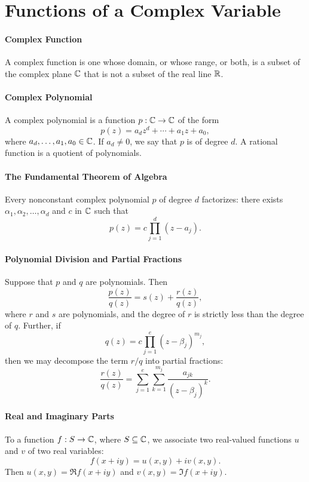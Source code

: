 \section{Functions of a Complex Variable}

\paragraph{Complex Function}
A complex function is one whose domain, or whose range, or both, is a subset of the complex plane \(\mathbb{C}\) that is not a subset of the real line \(\mathbb{R}\).

\paragraph{Complex Polynomial}
A complex polynomial is a function \(p: \mathbb{C} \to \mathbb{C}\) of the form
\[p(z) = a_dz^d + \cdots + a_1z + a_0,\]
where \(a_d, \dots, a_1, a_0 \in \mathbb{C}\). If \(a_d \neq 0\), we say that \(p\) is of degree \(d\). A rational function is a quotient of polynomials.

\paragraph{The Fundamental Theorem of Algebra}
Every nonconstant complex polynomial \(p\) of degree \(d\) factorizes: there exists \(\alpha_1, \alpha_2, \dots, \alpha_d\) and \(c\) in \(\mathbb{C}\) such that
\[p(z) = c \prod_{j=1}^d (z - a_j).\]

\paragraph{Polynomial Division and Partial Fractions}
Suppose that \(p\) and \(q\) are polynomials. Then
\[\frac{p(z)}{q(z)} = s(z) + \frac{r(z)}{q(z)},\]
where \(r\) and \(s\) are polynomials, and the degree of \(r\) is strictly less than the degree of \(q\). Further, if
\[q(z) = c\prod_{j=1}^e(z-\beta_j)^{m_j},\]
then we may decompose the term \(r / q\) into partial fractions:
\[\frac{r(z)}{q(z)} = \sum_{j=1}^e\sum_{k=1}^{m_j} \frac{a_{jk}}{(z-\beta_j)^k}.\]

\paragraph{Real and Imaginary Parts}
To a function \(f: S \to \mathbb{C}\), where \(S \subseteq \mathbb{C}\), we associate two real-valued functions \(u\) and \(v\) of two real variables:
\[f(x + iy) = u(x, y) + iv(x, y).\]
Then \(u(x,y) = \Re f(x + iy)\) and \(v(x,y) = \Im f(x + iy)\).

